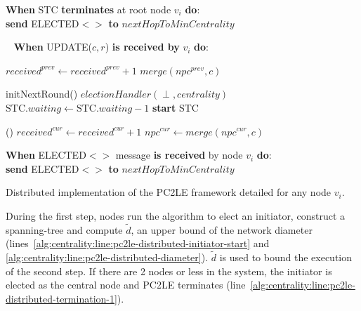 {	{\bf When} STC {\bf terminates} at root node $v_i$ {\bf do}:\\
	 {
		{\bf send} ELECTED${<}{>}$ {\bf to} $nextHopToMinCentrality$\label{alg:centrality:line:pc2le-distributed-elected-message-1}\;
	}
}{
	\setcounter{AlgoLine}{36}		
	\nonl~
	{\bf When} UPDATE($c,r$) {\bf is received by} ${v_i}$ {\bf do}:\label{alg:centrality:line:pc2le-distributed-round-1}
	
	 {
		 {
			$received^{prev} \gets received^{prev} + 1$\;
			$merge(npc^{prev}, c)$\;
			
			 {
				
				initNextRound()\;					
				 {
					\label{alg:centrality:line:pc2le-distributed-centrality-value}
					\nonl {}
					$electionHandler(\perp,centrality)$\;
					$\text{STC}.waiting \gets \text{STC}.waiting - 1$\;
					{\bf start} STC\;
					\label{alg:centrality:line:pc2le-distributed-start-stc}
				}
			}
		} () {
			$received^{cur} \gets received^{cur} + 1$\;
			$npc^{cur} \gets merge(npc^{cur}, c)$\;
		}
		\label{alg:centrality:line:pc2le-distributed-round-2}
	}
	
	\BlankLine	
	\BlankLine
	{\bf When} ELECTED${<}{>}$ message {\bf is received} by node $v_i$ {\bf do}:\\
	\label{alg:centrality:line:pc2le-distributed-elected-message-2}
	 {
		{\bf send} ELECTED${<}{>}$ {\bf to} $nextHopToMinCentrality$\;
	}
	\label{alg:centrality:line:pc2le-distributed-elected-message-3}
}{
	\caption{Distributed implementation of the PC2LE framework detailed for any node $v_i$.\label{alg:centrality:pc2le-distributed}}
}


During the first step, nodes run the \cheungIeCbAgg{} algorithm to elect an initiator, construct a spanning-tree and compute $\tilde{d}$, an upper bound of the network diameter (lines~\ref{alg:centrality:line:pc2le-distributed-initiator-start} and \ref{alg:centrality:line:pc2le-distributed-diameter}). $\tilde{d}$ is used to bound the execution of the second step. If there are 2 nodes or less in the system, the initiator is elected as the central node and PC2LE terminates (line~\ref{alg:centrality:line:pc2le-distributed-termination-1}).

